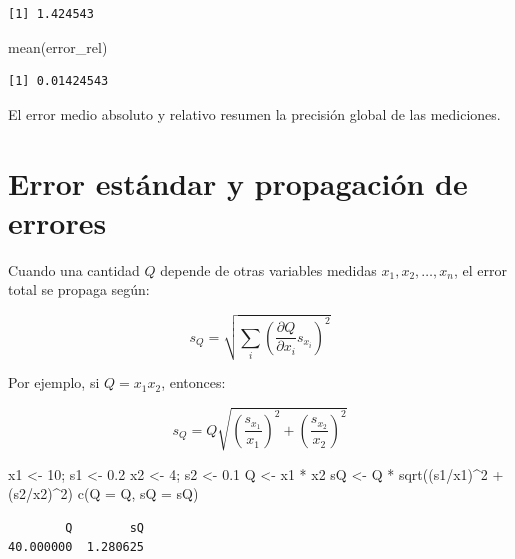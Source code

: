 \documentclass[
  spanish,
  letterpaper,
  DIV=11,
  numbers=noendperiod]{scrreprt}
\newenvironment{Shaded}{\begin{snugshade}}{\end{snugshade}}
\newcommand{\AttributeTok}[1]{\textcolor[rgb]{0.40,0.45,0.13}{#1}}
\newcommand{\DecValTok}[1]{\textcolor[rgb]{0.68,0.00,0.00}{#1}}
\newcommand{\FloatTok}[1]{\textcolor[rgb]{0.68,0.00,0.00}{#1}}
\newcommand{\FunctionTok}[1]{\textcolor[rgb]{0.28,0.35,0.67}{#1}}
\newcommand{\NormalTok}[1]{\textcolor[rgb]{0.00,0.23,0.31}{#1}}
\newcommand{\OtherTok}[1]{\textcolor[rgb]{0.00,0.23,0.31}{#1}}
\newcommand{\SpecialCharTok}[1]{\textcolor[rgb]{0.37,0.37,0.37}{#1}}
\begin{document}
\begin{verbatim}
[1] 1.424543
\end{verbatim}

\begin{Shaded}
\begin{Highlighting}[]
\FunctionTok{mean}\NormalTok{(error\_rel)}
\end{Highlighting}
\end{Shaded}

\begin{verbatim}
[1] 0.01424543
\end{verbatim}

El error medio absoluto y relativo resumen la precisión global de las
mediciones.

\section{Error estándar y propagación de
errores}\label{error-estuxe1ndar-y-propagaciuxf3n-de-errores}

Cuando una cantidad \(Q\) depende de otras variables medidas
\(x_1, x_2, \ldots, x_n\), el error total se propaga según:

\[s_Q = \sqrt{\sum_i \left(\frac{\partial Q}{\partial x_i} s_{x_i}\right)^2}\]

Por ejemplo, si \(Q = x_1 x_2\), entonces:

\[s_Q = Q \sqrt{\left(\frac{s_{x_1}}{x_1}\right)^2 + \left(\frac{s_{x_2}}{x_2}\right)^2}\]

\begin{Shaded}
\begin{Highlighting}[]
\NormalTok{x1 }\OtherTok{\textless{}{-}} \DecValTok{10}\NormalTok{; s1 }\OtherTok{\textless{}{-}} \FloatTok{0.2}
\NormalTok{x2 }\OtherTok{\textless{}{-}} \DecValTok{4}\NormalTok{; s2 }\OtherTok{\textless{}{-}} \FloatTok{0.1}
\NormalTok{Q }\OtherTok{\textless{}{-}}\NormalTok{ x1 }\SpecialCharTok{*}\NormalTok{ x2}
\NormalTok{sQ }\OtherTok{\textless{}{-}}\NormalTok{ Q }\SpecialCharTok{*} \FunctionTok{sqrt}\NormalTok{((s1}\SpecialCharTok{/}\NormalTok{x1)}\SpecialCharTok{\^{}}\DecValTok{2} \SpecialCharTok{+}\NormalTok{ (s2}\SpecialCharTok{/}\NormalTok{x2)}\SpecialCharTok{\^{}}\DecValTok{2}\NormalTok{)}
\FunctionTok{c}\NormalTok{(}\AttributeTok{Q =}\NormalTok{ Q, }\AttributeTok{sQ =}\NormalTok{ sQ)}
\end{Highlighting}
\end{Shaded}

\begin{verbatim}
        Q        sQ 
40.000000  1.280625 
\end{verbatim}
\end{document}
